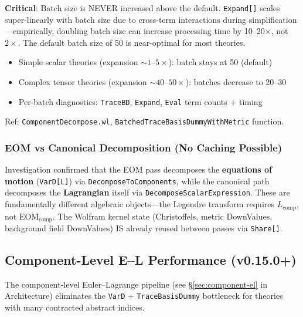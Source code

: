 \textbf{Critical}: Batch size is NEVER increased above the default. \texttt{Expand[]} scales super-linearly with batch size due to cross-term interactions during simplification---empirically, doubling batch size can increase processing time by 10--20$\times$, not $2\times$. The default batch size of 50 is near-optimal for most theories.

\begin{itemize}
  \item Simple scalar theories (expansion ${\sim}1$--$5\times$): batch stays at 50 (default)
  \item Complex tensor theories (expansion ${\sim}40$--$50\times$): batches decrease to 20--30
  \item Per-batch diagnostics: \texttt{TraceBD}, \texttt{Expand}, \texttt{Eval} term counts + timing
\end{itemize}

Ref: \texttt{ComponentDecompose.wl}, \texttt{BatchedTraceBasisDummyWithMetric} function.

\subsubsection{EOM vs Canonical Decomposition (No Caching Possible)}

Investigation confirmed that the EOM pass decomposes the \textbf{equations of motion} (\texttt{VarD[L]}) via \texttt{DecomposeToComponents}, while the canonical path decomposes the \textbf{Lagrangian} itself via \texttt{DecomposeScalarExpression}. These are fundamentally different algebraic objects---the Legendre transform requires $L_\text{comp}$, not $\text{EOM}_\text{comp}$. The Wolfram kernel state (Christoffels, metric DownValues, background field DownValues) IS already reused between passes via \texttt{Share[]}.

\subsection{Component-Level E--L Performance (v0.15.0+)}
\label{sec:component-el-perf}

The component-level Euler--Lagrange pipeline (see \S\ref{sec:component-el} in Architecture) eliminates the \texttt{VarD} + \texttt{TraceBasisDummy} bottleneck for theories with many contracted abstract indices.

